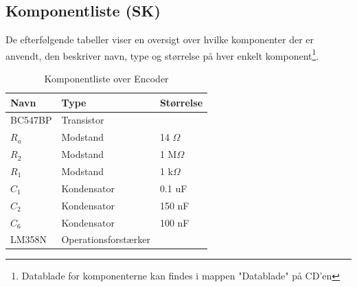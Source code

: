\newpage
\subsection{Komponentliste (SK)}

De efterfølgende tabeller viser en oversigt over hvilke komponenter der er anvendt, den beskriver navn, type og størrelse på hver enkelt komponent\footnote{Datablade for komponenterne kan findes i mappen "Datablade" på CD'en}. 


\begin{table}[htbp] \centering
\caption{Komponentliste over Encoder}
\begin{small}
    \begin{tabular}{|p{2cm}|p{4cm}|p{2cm}|}
    \hline
    \textbf{Navn}    & \textbf{Type}                 & \textbf{Størrelse} \\ \hline
    BC547BP    & Transistor           & ~         \\ \hline
    $R_a$      & Modstand             & 14 $\Omega$    \\ \hline
    $R_2$      & Modstand             & 1 M$\Omega$    \\ \hline
    $R_1$      & Modstand             & 1 k$\Omega$    \\ \hline
    $C_1$      & Kondensator          & 0.1 uF    \\ \hline
    $C_2$      & Kondensator          & 150 nF    \\ \hline
    $C_6$      & Kondensator           & 100 nF    \\ \hline
    LM358N     & Operationsforstærker & ~         \\ \hline
    \end{tabular}
   \end{small}
\label{table:Komponentliste encoder}
\end{table}

